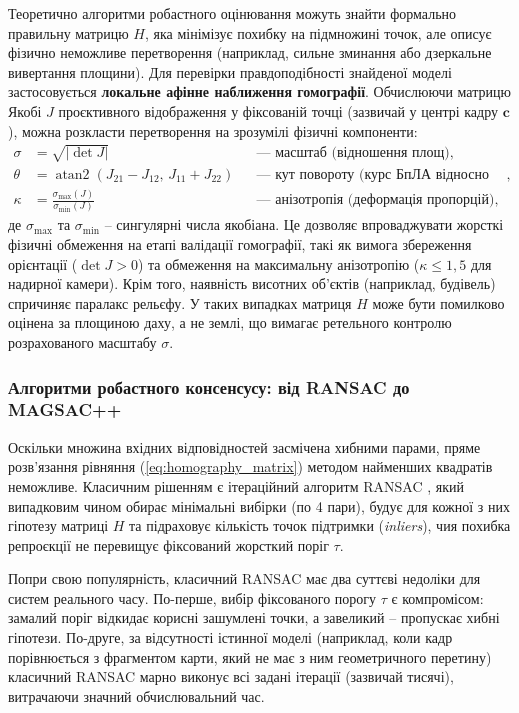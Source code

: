 \documentclass[a4paper, 12pt, titlepage]{article}
\begin{document}
Теоретично алгоритми робастного оцінювання можуть знайти формально правильну матрицю $H$, яка мінімізує похибку на підмножині точок, але описує фізично неможливе перетворення (наприклад, сильне зминання або дзеркальне вивертання площини). Для перевірки правдоподібності знайденої моделі застосовується \textbf{локальне афінне наближення гомографії}. Обчислюючи матрицю Якобі $J$ проєктивного відображення у фіксованій точці (зазвичай у центрі кадру $\mathbf{c}$), можна розкласти перетворення на зрозумілі фізичні компоненти:
\begin{align}
\sigma &= \sqrt{|\det J|} && \text{--- масштаб (відношення площ)}, \\
\theta &= \operatorname{atan2}(J_{21} - J_{12},\, J_{11} + J_{22}) && \text{--- кут повороту (курс БпЛА відносно карти)}, \\
\kappa &= \frac{\sigma_{\max}(J)}{\sigma_{\min}(J)} && \text{--- анізотропія (деформація пропорцій)},
\end{align}
де $\sigma_{\max}$ та $\sigma_{\min}$ -- сингулярні числа якобіана. Це дозволяє впроваджувати жорсткі фізичні обмеження на етапі валідації гомографії, такі як вимога збереження орієнтації ($\det J > 0$) та обмеження на максимальну анізотропію ($\kappa \le 1{,}5$ для надирної камери). Крім того, наявність висотних об'єктів (наприклад, будівель) спричиняє паралакс рельєфу. У таких випадках матриця $H$ може бути помилково оцінена за площиною даху, а не землі, що вимагає ретельного контролю розрахованого масштабу $\sigma$.

\subsubsection{Алгоритми робастного консенсусу: від RANSAC до MAGSAC++}
Оскільки множина вхідних відповідностей засмічена хибними парами, пряме розв'язання рівняння (\ref{eq:homography_matrix}) методом найменших квадратів неможливе. Класичним рішенням є ітераційний алгоритм RANSAC \cite{ransac}, який випадковим чином обирає мінімальні вибірки (по 4 пари), будує для кожної з них гіпотезу матриці $H$ та підраховує кількість точок підтримки (\textit{inliers}), чия похибка репроєкції не перевищує фіксований жорсткий поріг $\tau$.

Попри свою популярність, класичний RANSAC має два суттєві недоліки для систем реального часу. По-перше, вибір фіксованого порогу $\tau$ є компромісом: замалий поріг відкидає корисні зашумлені точки, а завеликий -- пропускає хибні гіпотези. По-друге, за відсутності істинної моделі (наприклад, коли кадр порівнюється з фрагментом карти, який не має з ним геометричного перетину) класичний RANSAC марно виконує всі задані ітерації (зазвичай тисячі), витрачаючи значний обчислювальний час.
\end{document}
